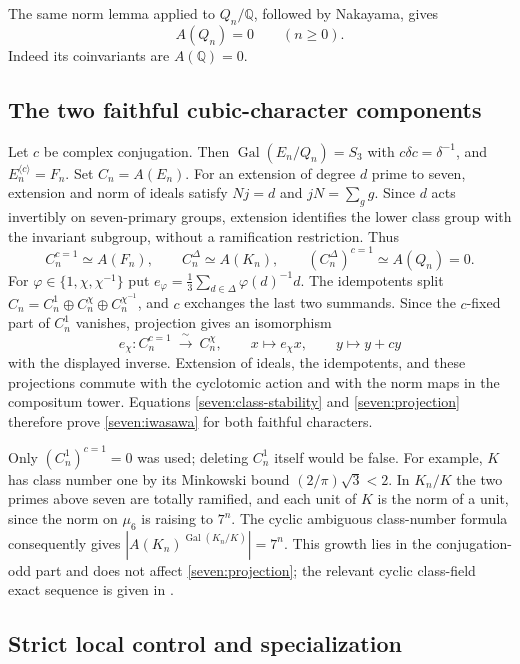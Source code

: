 The same norm lemma applied to $Q_n/\mathbb Q$, followed by Nakayama,
gives
\[
 A(Q_n)=0 \qquad(n\ge0).
 \tag{S31}\label{seven:rational-layer}
\]
Indeed its coinvariants are $A(\mathbb Q)=0$.

\subsection{The two faithful cubic-character components}
\label{seven:character-components}

Let $c$ be complex conjugation. Then
$\operatorname{Gal}(E_n/Q_n)=S_3$ with
$c\delta c=\delta^{-1}$, and $E_n^{\langle c\rangle}=F_n$.
Set $C_n=A(E_n)$.
For an extension of degree $d$ prime to seven, extension and norm of ideals
satisfy
$Nj=d$ and $jN=\sum_g g$.
Since $d$ acts invertibly on seven-primary groups, extension identifies the
lower class group with the invariant subgroup, without a ramification
restriction. Thus
\[
 C_n^{c=1}\simeq A(F_n),\qquad
 C_n^\Delta\simeq A(K_n),\qquad
 (C_n^\Delta)^{c=1}\simeq A(Q_n)=0.
 \tag{S32}\label{seven:prime-to-seven-descent}
\]
For $\varphi\in\{1,\chi,\chi^{-1}\}$ put
$e_\varphi=\frac13\sum_{d\in\Delta}\varphi(d)^{-1}d$.
The idempotents split
$C_n=C_n^1\oplus C_n^\chi\oplus C_n^{\chi^{-1}}$, and $c$ exchanges the
last two summands.
Since the $c$-fixed part of $C_n^1$ vanishes, projection gives an
isomorphism
\[
 e_\chi:C_n^{c=1}\ \xrightarrow{\ \sim\ }\ C_n^\chi,
 \qquad x\longmapsto e_\chi x,
 \qquad y\longmapsto y+cy
 \tag{S33}\label{seven:projection}
\]
with the displayed inverse.
Extension of ideals, the idempotents, and these projections commute with
the cyclotomic action and with the norm maps in the compositum tower.
Equations \eqref{seven:class-stability} and \eqref{seven:projection}
therefore prove \eqref{seven:iwasawa} for both faithful characters.

Only $(C_n^1)^{c=1}=0$ was used; deleting $C_n^1$ itself would be false.
For example, $K$ has class number one by its Minkowski bound
$(2/\pi)\sqrt3<2$. In $K_n/K$ the two primes above seven are totally
ramified, and each unit of $K$ is the norm of a unit, since the norm on
$\mu_6$ is raising to $7^n$.
The cyclic ambiguous class-number formula consequently gives
$|A(K_n)^{\operatorname{Gal}(K_n/K)}|=7^n$.
This growth lies in the conjugation-odd part and does not affect
\eqref{seven:projection}; the relevant cyclic class-field exact sequence
is given in \cite[Theorem~1.3.16]{sevenSharifi}.

\subsection{Strict local control and specialization}
\label{seven:control}

